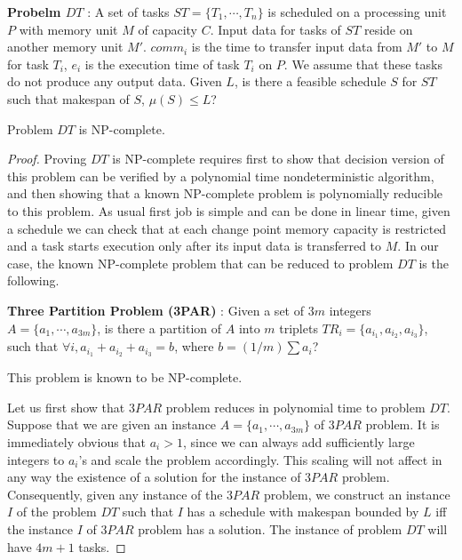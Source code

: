 \documentclass[runningheads]{llncs} %
\begin{document}
	
	\noindent\textbf{Probelm  $DT$} : A set of tasks $ST=\{T_1, \cdots, T_n\}$ is scheduled on a processing 
	unit $P$  with memory unit $M$ of capacity $C$. Input data for tasks of $ST$ reside on 
	another memory unit $M'$. $comm_i$ is the time to transfer input data from $M'$ to $M$ for task 
	$T_i$,  $e_i$ is the execution time of task $T_i$ on $P$. We assume that these tasks  do not produce any output data.  Given $L$, is there a feasible schedule $S$ for $ST$ such that makespan of $S$, $\mu(S) \le L$?
	\begin{theorem}
		Problem $DT$ is NP-complete.
	\end{theorem}
   \begin{proof}
   	
   	Proving $DT$ is NP-complete requires first to show that decision version of this problem can be 
   	verified by a polynomial time nondeterministic algorithm, and then showing that a known 
   	NP-complete problem is polynomially reducible to this problem. As usual first job is simple and can 
   	be 
   	done in linear time, given a schedule we can check that at each change point memory capacity is 
   	restricted and a task starts execution only after its input data is transferred to $M$. In our case, the 
   	known NP-complete problem that can be reduced to problem $DT$ is the following.
   	
   	
   	\noindent \textbf{Three Partition Problem (3PAR)} : Given a set of $3m$ integers $A = \{ a_1,  
   	\cdots, a_{3m }\}$, is there a partition of $A$ into $m$ triplets $TR_i = \{a_{i_1}, a_{i_2}, a_{i_3}\}$, 
   	such that $\forall i, a_{i_1} + a_{i_2}  + a_{i_3}  = b$, where $b=(1/m) \sum a_i $?
   	
   	This problem is known to be NP-complete.
   	
   	\noindent Let us first show that $3PAR$ problem reduces in polynomial time to problem $DT$.  
   	Suppose that we 
   	are given an instance  $A = \{ a_1,  \cdots, a_{3m }\}$ of $3PAR$ problem. It is immediately obvious 
   	that $a_i>1$, since we can always add sufficiently large integers to $a_i$'s and scale the problem 
   	accordingly.  This scaling will not affect in any way the existence of a solution for the instance of $3PAR$ problem. Consequently, given any instance of the $3PAR$ problem, we construct an instance $I$ of the problem $DT$ such that $I$ has a schedule with makespan bounded by $L$ iff the instance 
   	$I$ of $3PAR$ problem has a solution. The instance of problem $DT$ will have $4m+1$ tasks.
   	

\end{proof}
\end{document}
